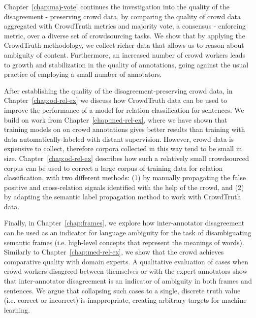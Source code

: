 Chapter~\ref{chap:maj-vote} continues the investigation into the quality of the disagreement - preserving crowd data, by comparing the quality of crowd data aggregated with CrowdTruth metrics and majority vote, a consensus - enforcing metric, over a diverse set of crowdsourcing tasks. We show that by applying the CrowdTruth methodology, we collect richer data that allows us to reason about ambiguity of content. Furthermore, an increased number of crowd workers leads to growth and stabilization in the quality of annotations, going against the usual practice of employing a small number of annotators.

After establishing the quality of the disagreement-preserving crowd data, in Chapter~\ref{chap:od-rel-ex} we discuss how CrowdTruth data can be used to improve the performance of a model for relation classification for sentences. We build on work from Chapter~\ref{chap:med-rel-ex}, where we have shown that training models on on crowd annotations gives better results than training with data automatically-labeled with distant supervision. However, crowd data is expensive to collect, therefore corpora collected in this way tend to be small in size. Chapter~\ref{chap:od-rel-ex} describes how such a relatively small crowdsourced corpus can be used to correct a large corpus of training data for relation classification, with two different methods: (1) by manually propagating the false positive and cross-relation signals identified with the help of the crowd, and (2) by adapting the semantic label propagation method to work with CrowdTruth data.

Finally, in Chapter~\ref{chap:frames}, we explore how inter-annotator disagreement can be used as an indicator for language ambiguity for the task of disambiguating semantic frames (i.e. high-level concepts that represent the meanings of words). Similarly to Chapter~\ref{chap:med-rel-ex}, we show that the crowd achieves comparative quality with domain experts. A qualitative evaluation of cases when crowd workers disagreed between themselves or with the expert annotators show that inter-annotator disagreement is an indicator of ambiguity in both frames and sentences. We argue that collapsing such cases to a single, discrete truth value (i.e. correct or incorrect) is inappropriate, creating arbitrary targets for machine learning.
